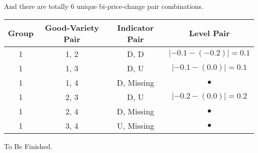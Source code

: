 And there are totally $ 6 $ unique bi-price-change pair combinations.

\begin{tabular}{cccc}
	\hline\hline
	Group & Good-Variety Pair & Indicator Pair &       Level Pair        \\ \hline
	1   &       1, 2        &      D, D      & $ |-0.1-(-0.2)| = 0.1 $ \\
	1   &       1, 3        &      D, U      & $ |-0.1-(0.0)| = 0.1 $  \\
	1   &       1, 4        &   D, Missing   &       $ \bullet $       \\
	1   &       2, 3        &      D, U      & $ |-0.2-(0.0)| = 0.2 $  \\
	1   &       2, 4        &   D, Missing   &       $ \bullet $       \\
	1   &       3, 4        &   U, Missing   &       $ \bullet $       \\ \hline\hline
\end{tabular}

To Be Finished.

\listoftables

